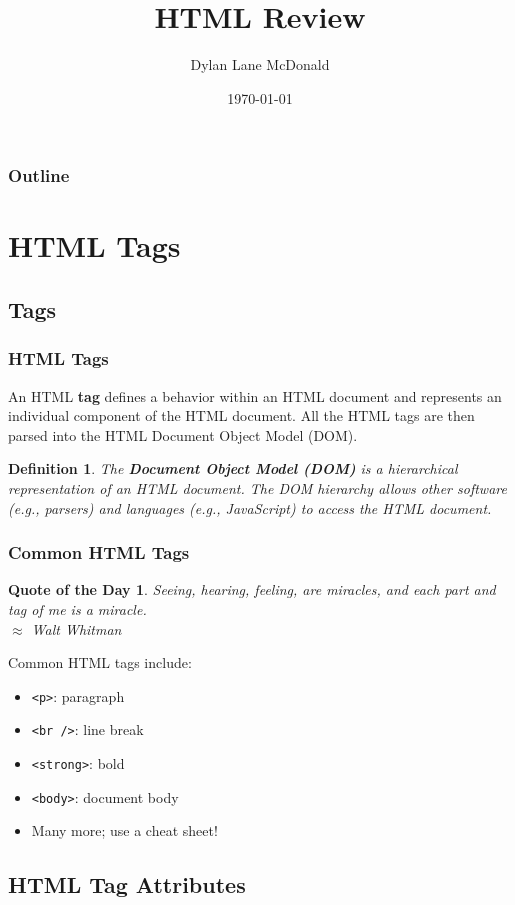 \documentclass[aspectratio=169]{beamer}
\title{HTML Review}
\author{Dylan Lane McDonald}
\institute{CNM STEMulus Center\\Web Development with PHP}
\date{\today}
\newtheorem{defn}{Definition}
\newtheorem{qotd}{Quote of the Day}
\begin{document}
\lstset{language=HTML}
\begin{frame}
\titlepage
\end{frame}

\begin{frame}
\frametitle{Outline}
\tableofcontents
\end{frame}

\section{HTML Tags}
\subsection{Tags}
\begin{frame}
\frametitle{HTML Tags}
An HTML \textbf{tag} defines a behavior within an HTML document and represents an individual component of the HTML document. All the HTML tags are then parsed into the HTML Document Object Model (DOM).
\pause
\begin{defn}
The \textbf{Document Object Model (DOM)} is a hierarchical representation of an HTML document. The DOM hierarchy allows other software (e.g., parsers) and languages (e.g., JavaScript) to access the HTML document.
\end{defn}
\end{frame}

\begin{frame}
\frametitle{Common HTML Tags}
\begin{qotd}
Seeing, hearing, feeling, are miracles, and each part and tag of me is a miracle.\\
$\approx$ Walt Whitman
\end{qotd}
\pause

Common HTML tags include:
\begin{itemize}
	\item \texttt{<p>}: paragraph
	\item \texttt{<br />}: line break
	\item \texttt{<strong>}: bold
	\item \texttt{<body>}: document body
	\item Many more; use a cheat sheet! \cite{cheatography, w3schools}
\end{itemize}
\end{frame}

\subsection{HTML Tag Attributes}
\end{document}
